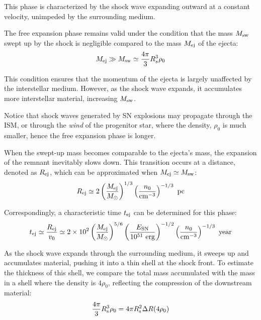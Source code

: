 This phase is characterized by the shock wave expanding outward at a constant velocity, unimpeded by the surrounding medium.
 
 
%
 
The free expansion phase remains valid under the condition that the mass \( M_{\rm sw} \) swept up by the shock is negligible compared to the mass \( M_{\rm ej} \) of the ejecta:
%
\[
M_{\rm ej} \gg M_{\rm sw} \simeq \frac{4\pi}{3} R_s^3 \rho_0
\]

This condition ensures that the momentum of the ejecta is largely unaffected by the interstellar medium. However, as the shock wave expands, it accumulates more interstellar material, increasing \( M_{\rm sw} \).

Notice that shock waves generated by SN explosions may propagate through the ISM, or through the \emph{wind} of the progenitor star, where the density, \( \rho_0 \) is much smaller, hence the free expansion phase is longer.

When the swept-up mass becomes comparable to the ejecta's mass, the expansion of the remnant inevitably slows down. 
%
This transition occurs at a distance, denoted as \( R_{\rm ej} \), which can be approximated when \( M_{\rm ej} \simeq M_{\rm sw} \):
%
\[
R_{\rm ej} \simeq 2 \left( \frac{M_{\rm ej}}{M_\odot} \right)^{1/3} \left( \frac{n_0}{\text{cm}^{-3}} \right)^{-1/3}~\text{pc}
\]

Correspondingly, a characteristic time \( t_{\rm ej} \) can be determined for this phase:
%
\[
t_{\rm ej} \simeq \frac{R_{\rm ej}}{v_0} \simeq 2 \times 10^2 \left(\frac{M_{\rm ej}}{M_\odot}\right)^{5/6} \left(\frac{E_{\rm SN}}{10^{51}~\text{erg}}\right)^{-1/2} \left(\frac{n_0}{\text{cm}^{-3}}\right)^{-1/3}~\text{year}
\]

As the shock wave expands through the surrounding medium, it sweeps up and accumulates material, pushing it into a thin shell at the shock front. To estimate the thickness of this shell, we compare the total mass accumulated with the mass in a shell where the density is \( 4 \rho_0 \), reflecting the compression of the downstream material:
%
\[ \frac{4\pi}{3} R_{\rm s}^3 \rho_0 = 4 \pi R_{\rm s}^2 \Delta R (4 \rho_0) \]

